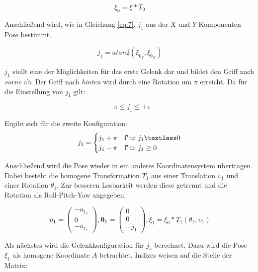 \begin{equation}
\xi_0 = \xi * T_0
\label{eq:15}
\end{equation}

Anschließend wird, wie in Gleichung \ref{eq:7}, $j_1$ aus der $X$ und $Y$ Komponenten Pose bestimmt.

\begin{equation}
j_1 = atan2(\xi_{0_Y},\xi_{0_X})
\label{eq:16}
\end{equation}

$j_1$ stellt eine der Möglichkeiten für das erste Gelenk dar und bildet den Griff nach \textit{vorne} ab. Der Griff nach \textit{hinten} wird durch eine Rotation um $\pi$ erreicht. Da für die Einstellung von $j_1$ gilt:

\begin{equation}
-\pi \leq j_1 \leq +\pi 
\label{eq:17}
\end{equation}

Ergibt sich für die zweite Konfiguration:
\begin{equation}
j_1 = 
\begin{cases}
j_1 + \pi & \text{f"ur } j_1  \textless 0 \\
j_1 - \pi & \text{f"ur } j_1  \ge 0 
\end{cases}
\label{eq:18}
\end{equation}

Anschließend wird die Pose wieder in ein anderes Koordinatensystem übertragen. Dabei besteht die homogene Transformation $T_1$ aus einer Translation $\upsilon_1$ und einer Rotation $\theta_1$. Zur besseren Lesbarkeit werden diese getrennt und die Rotation als Roll-Pitch-Yaw angegeben:

\begin{equation}
\pmb{\upsilon_1} = \left(\begin{array}{c} 
-a_{1_x} \\
0\\
-a_{1_z}
\end{array}\right)
,
\pmb{\theta_1} = \left(\begin{array}{c} 
0 \\
0\\
-j_1
\end{array}\right)	
,
\xi_1 = \xi_0 * T_1(\theta_1, \upsilon_1)	
\label{eq:19}
\end{equation}

Als nächstes wird die Gelenkkonfiguration für $j_5$ berechnet. Dazu wird die Pose $\xi_1$ als homogene Koordinate $A$ betrachtet. Indizes weisen auf die Stelle der Matrix:

